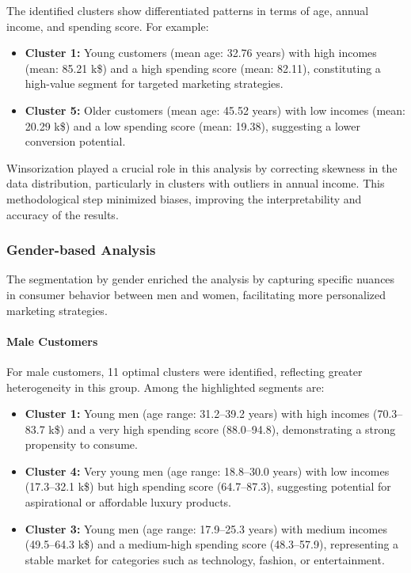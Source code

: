 \documentclass[10pt]{article}
\begin{document}
The identified clusters show differentiated patterns in terms of age, annual income, and spending score. For example:
\begin{itemize}
    \item \textbf{Cluster 1:} Young customers (mean age: 32.76 years) with high incomes (mean: 85.21 k\$) and a high spending score (mean: 82.11), constituting a high-value segment for targeted marketing strategies.
    \item \textbf{Cluster 5:} Older customers (mean age: 45.52 years) with low incomes (mean: 20.29 k\$) and a low spending score (mean: 19.38), suggesting a lower conversion potential.
\end{itemize}

Winsorization played a crucial role in this analysis by correcting skewness in the data distribution, particularly in clusters with outliers in annual income. This methodological step minimized biases, improving the interpretability and accuracy of the results.

\subsubsection*{Gender-based Analysis}

The segmentation by gender enriched the analysis by capturing specific nuances in consumer behavior between men and women, facilitating more personalized marketing strategies.

\paragraph{Male Customers}

For male customers, 11 optimal clusters were identified, reflecting greater heterogeneity in this group. Among the highlighted segments are:
\begin{itemize}
    \item \textbf{Cluster 1:} Young men (age range: 31.2--39.2 years) with high incomes (70.3--83.7 k\$) and a very high spending score (88.0--94.8), demonstrating a strong propensity to consume.
    \item \textbf{Cluster 4:} Very young men (age range: 18.8--30.0 years) with low incomes (17.3--32.1 k\$) but high spending score (64.7--87.3), suggesting potential for aspirational or affordable luxury products.
    \item \textbf{Cluster 3:} Young men (age range: 17.9--25.3 years) with medium incomes (49.5--64.3 k\$) and a medium-high spending score (48.3--57.9), representing a stable market for categories such as technology, fashion, or entertainment.
\end{itemize}
\end{document}
